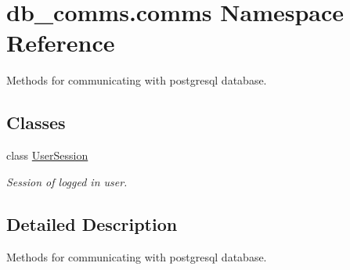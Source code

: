 \hypertarget{namespacedb__comms_1_1comms}{}\section{db\+\_\+comms.\+comms Namespace Reference}
\label{namespacedb__comms_1_1comms}


Methods for communicating with postgresql database.  


\subsection*{Classes}
\begin{DoxyCompactItemize}
\item 
class \hyperlink{classdb__comms_1_1comms_1_1_user_session}{User\+Session}
\begin{DoxyCompactList}\small\item\em Session of logged in user. \end{DoxyCompactList}\end{DoxyCompactItemize}


\subsection{Detailed Description}
Methods for communicating with postgresql database. 
